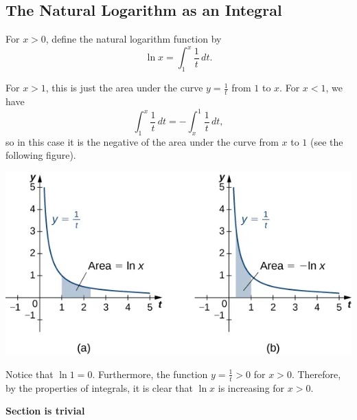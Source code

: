 \documentclass{report}
\begin{document}
        \subsection*{The Natural Logarithm as an Integral}
        \bigbreak \noindent 
        \smallbreak \noindent
        \begin{definition}
            For $x > 0$, define the natural logarithm function by
            \[
            \ln x = \int_1^x \frac{1}{t} \, dt.
            \]
        \end{definition}
        \bigbreak \noindent 
        \begin{minipage}[]{0.47\textwidth}
        
        For $x > 1$, this is just the area under the curve $y = \frac{1}{t}$ from $1$ to $x$. 
        \bigbreak \noindent 
        For $x < 1$, we have
        \bigbreak \noindent 
        \[
        \int_1^x \frac{1}{t} \, dt = -\int_x^1 \frac{1}{t} \, dt,
        \]
        \bigbreak \noindent 
        so in this case it is the negative of the area under the curve from $x$ to $1$ (see the following figure).
        \end{minipage}
        \begin{minipage}[]{0.47\textwidth}
            \begin{center}
                \includegraphics[scale=0.45]{./figures/graph50.png}
            \end{center}
        \end{minipage}
        \bigbreak \noindent 
        Notice that $\ln 1 = 0$. Furthermore, the function $y = \frac{1}{t} > 0$ for $x > 0$. Therefore, by the properties of integrals, it is clear that $\ln x$ is increasing for $x > 0$.

        \bigbreak \noindent 
        \begin{center}
            \begin{Huge}
                \textbf{Section is trivial}
            \end{Huge}
        \end{center}




        








    


    
    

    

  

  
  
  
  






    


    
\end{document}
